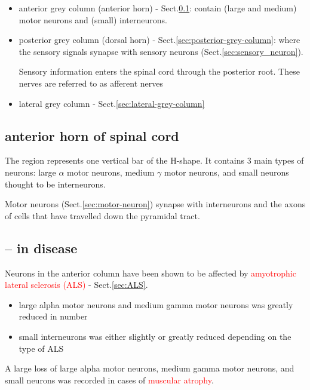  \begin{itemize}
    \item anterior grey column (anterior horn) -
    Sect.\ref{sec:anterior-grey-column}: contain (large and medium) motor
    neurons and (small) interneurons.
    
    \item posterior grey column (dorsal horn) -
    Sect.\ref{sec:posterior-grey-column}: where the sensory signals synapse with
    sensory neurons (Sect.\ref{sec:sensory_neuron}).
    
    Sensory information enters the spinal cord through the posterior root.
    These nerves are referred to as afferent nerves

    \item lateral grey column - Sect.\ref{sec:lateral-grey-column}
  \end{itemize}

\subsection{anterior horn of spinal cord}
\label{sec:anterior-grey-column}  

The region represents one vertical bar of the H-shape. It contains 3 main types
of neurons: large $\alpha$ motor neurons, medium $\gamma$ motor neurons, and
small neurons thought to be interneurons.
    
Motor neurons (Sect.\ref{sec:motor-neuron}) synapse with interneurons and the
axons of cells that have travelled down the pyramidal tract.

\subsection{-- in disease}

Neurons in the anterior column have been shown to be affected by
\textcolor{red}{amyotrophic lateral sclerosis (ALS)} - Sect.\ref{sec:ALS}.
\begin{itemize}
  \item large alpha motor neurons and medium gamma motor neurons was greatly
  reduced in number
  
  \item  small interneurons was either slightly or greatly reduced depending on
  the type of ALS
\end{itemize}

A large loss of large alpha motor neurons, medium gamma motor neurons, and small
neurons was recorded in cases of \textcolor{red}{muscular atrophy}.

